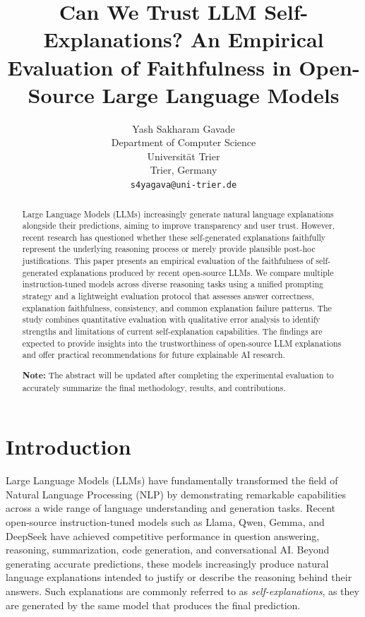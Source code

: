 \documentclass{article}
\title{Can We Trust LLM Self-Explanations? An Empirical Evaluation of Faithfulness in Open-Source Large Language Models}
\author{
Yash Sakharam Gavade\\
Department of Computer Science\\
Universität Trier\\
Trier, Germany\\
\texttt{s4yagava@uni-trier.de}
}
\begin{document}
\maketitle


\begin{abstract}
Large Language Models (LLMs) increasingly generate natural language explanations alongside their predictions, aiming to improve transparency and user trust. However, recent research has questioned whether these self-generated explanations faithfully represent the underlying reasoning process or merely provide plausible post-hoc justifications. This paper presents an empirical evaluation of the faithfulness of self-generated explanations produced by recent open-source LLMs. We compare multiple instruction-tuned models across diverse reasoning tasks using a unified prompting strategy and a lightweight evaluation protocol that assesses answer correctness, explanation faithfulness, consistency, and common explanation failure patterns. The study combines quantitative evaluation with qualitative error analysis to identify strengths and limitations of current self-explanation capabilities. The findings are expected to provide insights into the trustworthiness of open-source LLM explanations and offer practical recommendations for future explainable AI research.

\textbf{Note:} The abstract will be updated after completing the experimental evaluation to accurately summarize the final methodology, results, and contributions.

\end{abstract}







\section{Introduction}

Large Language Models (LLMs) have fundamentally transformed the field of Natural Language Processing (NLP) by demonstrating remarkable capabilities across a wide range of language understanding and generation tasks. Recent open-source instruction-tuned models such as Llama, Qwen, Gemma, and DeepSeek have achieved competitive performance in question answering, reasoning, summarization, code generation, and conversational AI. Beyond generating accurate predictions, these models increasingly produce natural language explanations intended to justify or describe the reasoning behind their answers. Such explanations are commonly referred to as \emph{self-explanations}, as they are generated by the same model that produces the final prediction.
\end{document}
